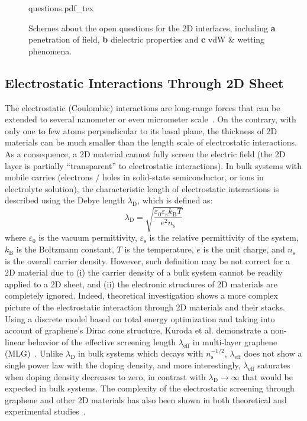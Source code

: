 \begin{figure}[h]
  \centering
  {questions.pdf_tex}
  \caption{\label{fig:intro-questions}%
    Schemes about the open questions for the 2D interfaces, including
    \textbf{a} penetration of field, \textbf{b} dielectric properties
    and \textbf{c} vdW \& wetting phenomena. }
\end{figure}


\subsection{Electrostatic Interactions Through 2D Sheet}
\label{sec:electr-inter-thro}

The electrostatic (Coulombic) interactions are long-range forces that
can be extended to several nano\-meter or even micro\-meter scale~\cite{Lacava_2016-electrodyn}.
%
On the contrary, with only one to few atoms perpendicular to its basal
plane, the thickness of 2D materials can be much smaller than the
length scale of electrostatic interactions.
%
As a consequence, a 2D material cannot fully screen the electric field
(\ie the 2D layer is partially ``transparent'' to electrostatic
interactions).
%
In bulk systems with mobile carries (electrons / holes in solid-state
semiconductor, or ions in electrolyte solution), the characteristic
length of electrostatic interactions is described using the Debye
length $\lambda_{\mathrm{D}}$, which is defined as:
\begin{equation}
  \label{eq:intro-debye}
  \lambda_{\mathrm{D}} = {\displaystyle \sqrt{
      \frac{\varepsilon_{0} \varepsilon_{\mathrm{s}} k_{\mathrm{B}} T}
      {e^{2} n_{\mathrm{s}}}
    }}
\end{equation}
where $\varepsilon_{0}$ is the vacuum permittivity,
$\varepsilon_{\mathrm{s}}$ is the relative permittivity of the system,
$k_{\mathrm{B}}$ is the Boltzmann constant, $T$ is the temperature,
$e$ is the unit charge, and $n_{\mathrm{s}}$ is the overall carrier
density.
%
However, such definition may be not correct for a 2D material due to
(i) the carrier density of a bulk system cannot be readily applied to
a 2D sheet, and (ii) the electronic structures of 2D materials are
completely ignored.
%
Indeed, theoretical investigation shows a more complex picture of the
electrostatic interaction through 2D materials and their stacks.
%
Using a discrete model based on total energy optimization and taking
into account of graphene's Dirac cone structure, Kuroda et
al. demonstrate a non-linear behavior of the effective screening
length $\lambda_{\mathrm{eff}}$ in multi-layer graphene
(MLG)~\cite{Kuroda_2011_PRL_ML,Kuroda_2011_ML_gr,Rokni_2017}.
%
Unlike $\lambda_{\mathrm{D}}$ in bulk systems which decays with
$n_{\mathrm{s}}^{-1/2}$, $\lambda_{\mathrm{eff}}$ does not show a
single power law with the doping density, and more interestingly,
$\lambda_{\mathrm{eff}}$ saturates when doping density decreases to
zero, in contrast with $\lambda_{\mathrm{D}} \to \infty$ that would be
expected in bulk systems.
%
The complexity of the electrostatic screening through graphene and
other 2D materials has also been shown in both theoretical and
experimental
studies~\cite{Datta_2009_ML_Screening,Uesugi_2013_EDL_ML,Goto_2013_ML_Gr,Liluhua_2014_hbn}.
%

